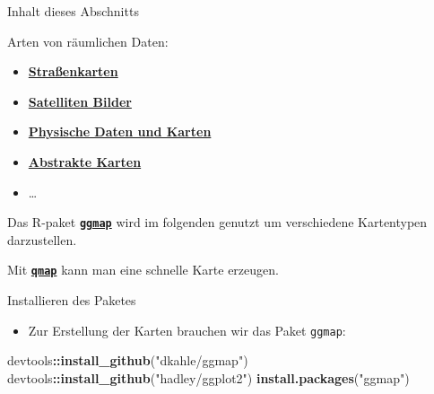 \documentclass[ignorenonframetext,]{beamer}
\newenvironment{Shaded}{\begin{snugshade}}{\end{snugshade}}
\newcommand{\KeywordTok}[1]{\textcolor[rgb]{0.13,0.29,0.53}{\textbf{#1}}}
\newcommand{\StringTok}[1]{\textcolor[rgb]{0.31,0.60,0.02}{#1}}
\newcommand{\OperatorTok}[1]{\textcolor[rgb]{0.81,0.36,0.00}{\textbf{#1}}}
\newcommand{\NormalTok}[1]{#1}
\providecommand{\tightlist}{%
  \setlength{\itemsep}{0pt}\setlength{\parskip}{0pt}}
\begin{document}
\begin{frame}[fragile]{Inhalt dieses Abschnitts}

Arten von räumlichen Daten:

\begin{itemize}
\tightlist
\item
  \href{https://www.nceas.ucsb.edu/~frazier/RSpatialGuides/ggmap/ggmapCheatsheet.pdf}{\textbf{Straßenkarten}}
\item
  \href{http://www.mostlymuppet.com/tag/maps/}{\textbf{Satelliten
  Bilder}}
\item
  \href{http://gis.stackexchange.com/questions/3083/what-makes-a-map-beautiful/45518\#45518}{\textbf{Physische
  Daten und Karten}}
\item
  \href{http://www.designfaves.com/2014/03/abstracted-maps-reveal-cities-personalities}{\textbf{Abstrakte
  Karten}}
\item
  \ldots{}
\end{itemize}

Das R-paket
\href{http://journal.r-project.org/archive/2013-1/kahle-wickham.pdf}{\textbf{\texttt{ggmap}}}
wird im folgenden genutzt um verschiedene Kartentypen darzustellen.

Mit
\href{http://www.inside-r.org/packages/cran/ggmap/docs/qmap}{\textbf{\texttt{qmap}}}
kann man eine schnelle Karte erzeugen.

\end{frame}

\begin{frame}[fragile]{Installieren des Paketes}

\begin{itemize}
\tightlist
\item
  Zur Erstellung der Karten brauchen wir das Paket \texttt{ggmap}:
\end{itemize}

\begin{Shaded}
\begin{Highlighting}[]
\NormalTok{devtools}\OperatorTok{::}\KeywordTok{install_github}\NormalTok{(}\StringTok{"dkahle/ggmap"}\NormalTok{)}
\NormalTok{devtools}\OperatorTok{::}\KeywordTok{install_github}\NormalTok{(}\StringTok{"hadley/ggplot2"}\NormalTok{)}
\KeywordTok{install.packages}\NormalTok{(}\StringTok{"ggmap"}\NormalTok{)}
\end{Highlighting}
\end{Shaded}

\end{frame}
\end{document}
